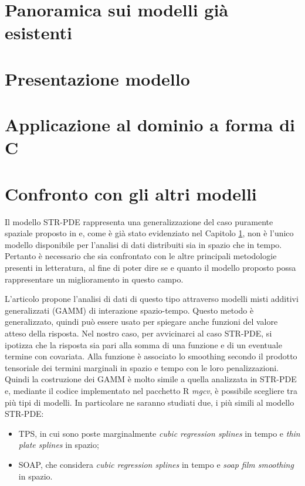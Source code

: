 \documentclass[a4paper,11pt,twoside,openright]{book}							%
\begin{document}
\chapter{Panoramica sui modelli già esistenti}
\label{cap:panoramica}

\chapter{Presentazione modello}
\label{cap:modello}

\chapter{Applicazione al dominio a forma di C}
\label{cap:domC}

\chapter{Confronto con gli altri modelli}
\label{cap:confronto}

Il modello STR-PDE rappresenta una generalizzazione del caso puramente spaziale proposto in \cite{art:sangalli} e, come è già stato evidenziato nel Capitolo \ref{cap:panoramica}, non è l'unico modello disponibile per l'analisi di dati distribuiti sia in spazio che in tempo. Pertanto è necessario che sia confrontato con le altre principali metodologie presenti in letteratura, al fine di poter dire se e quanto il modello proposto possa rappresentare un miglioramento in questo campo.

L'articolo \cite{art:augustin} propone l'analisi di dati di questo tipo attraverso modelli misti additivi generalizzati (GAMM) di interazione spazio-tempo. Questo metodo è generalizzato, quindi può essere usato per spiegare anche funzioni del valore atteso della risposta. Nel nostro caso, per avvicinarci al caso STR-PDE, si ipotizza che la risposta sia pari alla somma di una funzione e di un eventuale termine con covariata. Alla funzione è associato lo smoothing secondo il prodotto tensoriale dei termini marginali in spazio e tempo con le loro penalizzazioni. Quindi la costruzione dei GAMM è molto simile a quella analizzata in STR-PDE e, mediante il codice implementato nel pacchetto R \textit{mgcv}, è possibile scegliere tra più tipi di modelli. In particolare ne saranno studiati due, i più simili al modello STR-PDE:
\begin{itemize}
\item TPS, in cui sono poste marginalmente \textit{cubic regression splines} in tempo e \textit{thin plate splines} in spazio;
\item SOAP, che considera \textit{cubic regression splines} in tempo e \textit{soap film smoothing} in spazio.
\end{itemize}
\end{document}
